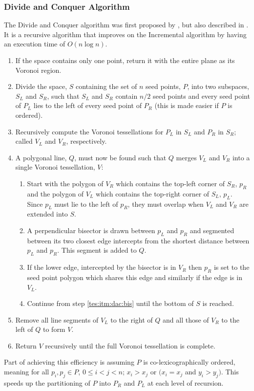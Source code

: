 \subsubsection{Divide and Conquer Algorithm}\label{tes:ssec:dac}
The Divide and Conquer algorithm was first proposed by \citet{shamos1975closest}, but also described in \citep{okabe2009spatial}. It is a recursive algorithm that improves on the Incremental algorithm by having an execution time of $O(n\log n)$.
\begin{enumerate}
\item If the space contains only one point, return it with the entire plane as its Voronoi region.
\item Divide the space, $S$ containing the set of $n$ seed points, $P$, into two subspaces, $S_L$ and $S_R$, such that $S_L$ and $S_R$ contain $n/2$ seed points and every seed point of $P_L$ lies to the left of every seed point of $P_R$ (this is made easier if $P$ is ordered).
\item Recursively compute the Voronoi tessellations for $P_L$ in $S_L$ and $P_R$ in $S_R$; called $V_L$ and $V_R$, respectively.
\item A polygonal line, $Q$, must now be found such that $Q$ merges $V_L$ and $V_R$ into a single Voronoi tessellation, $V$:
\begin{enumerate}
 \item Start with the polygon of $V_R$ which contains the top-left corner of $S_R$, $p_R$ and the polygon of $V_L$ which contains the top-right corner of $S_L$, $p_L$. Since $p_L$ must lie to the left of $p_R$, they must overlap when $V_L$ and $V_R$ are extended into $S$.
 \item\label{tes:itm:dac:bis} A perpendicular bisector is drawn between $p_L$ and $p_R$ and segmented between its two closest edge intercepts from the shortest distance between $p_L$ and $p_R$. This segment is added to $Q$.
 \item If the lower edge, intercepted by the bisector is in $V_R$ then $p_R$ is set to the seed point polygon which shares this edge and similarly if the edge is in $V_L$.
 \item Continue from step \ref{tes:itm:dac:bis} until the bottom of $S$ is reached.
\end{enumerate}
\item Remove all line segments of $V_L$ to the right of $Q$ and all those of $V_R$ to the left of $Q$ to form $V$.
\item Return $V$ recursively until the full Voronoi tessellation is complete.
\end{enumerate}
Part of achieving this efficiency is assuming $P$ is co-lexicographically ordered, meaning for all $p_i,p_j \in P$, $0 \leq i < j < n$; $x_i > x_j$ or $(x_i = x_j$ and $y_i > y_j)$. This speeds up the partitioning of $P$ into $P_R$ and $P_L$ at each level of recursion.
%
